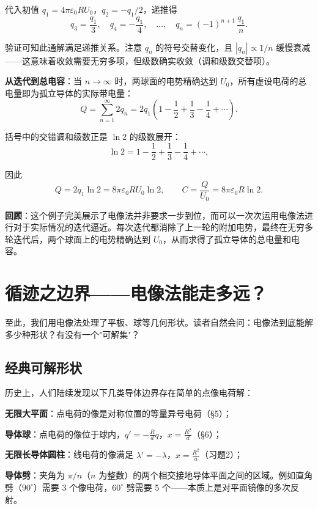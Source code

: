 \begin{so}[两个接触导体球的电容]
    代入初值 $q_1 = 4\pi\varepsilon_0 R U_0$，$q_2 = -q_1/2$，递推得
    \[
        q_3 = \frac{q_1}{3},\quad q_4 = -\frac{q_1}{4},\quad \ldots,\quad
        q_n = (-1)^{n+1}\,\frac{q_1}{n}.
    \]

    验证可知此通解满足递推关系。注意 $q_n$ 的符号交替变化，且 $|q_n| \propto 1/n$ 缓慢衰减——这意味着收敛需要无穷多项，但级数确实收敛（调和级数交替项）。

    \textbf{从迭代到总电容}：当 $n \to \infty$ 时，两球面的电势精确达到 $U_0$，所有虚设电荷的总电量即为孤立导体的实际带电量：
    \[
        Q = \sum_{n=1}^{\infty} 2q_n
        = 2q_1 \left( 1 - \frac{1}{2} + \frac{1}{3} - \frac{1}{4} + \cdots \right).
    \]

    括号中的交错调和级数正是 $\ln 2$ 的级数展开：
    \[
        \ln 2 = 1 - \frac{1}{2} + \frac{1}{3} - \frac{1}{4} + \cdots,
    \]

    因此
    \[
        Q = 2q_1 \ln 2 = 8\pi\varepsilon_0 R U_0 \ln 2,
        \qquad
        \boxed{C = \frac{Q}{U_0} = 8\pi\varepsilon_0 R \ln 2}.
    \]

    \textbf{回顾}：这个例子完美展示了电像法并非要求一步到位，而可以一次次运用电像法进行对于实际情况的迭代逼近。每次迭代都消除了上一轮的附加电势，最终在无穷多轮迭代后，两个球面上的电势精确达到 $U_0$，从而求得了孤立导体的总电量和电容。
\end{so}


\section{循迹之边界——电像法能走多远？}

至此，我们用电像法处理了平板、球等几何形状。读者自然会问：电像法到底能解多少种形状？有没有一个"可解集"？

\subsection{经典可解形状}

历史上，人们陆续发现以下几类导体边界存在简单的点像电荷解：

\begin{Itemize}
    \item \textbf{无限大平面}：点电荷的像是对称位置的等量异号电荷（§5）；
    \item \textbf{导体球}：点电荷的像位于球内，$q' = -\frac{R}{d}q$，$x = \frac{R^2}{d}$（§6）；
    \item \textbf{无限长导体圆柱}：线电荷的像满足 $\lambda' = -\lambda$，$x = \frac{R^2}{a}$（习题2）；
    \item \textbf{导体劈}：夹角为 $\pi/n$（$n$ 为整数）的两个相交接地导体平面之间的区域。例如直角劈（$90^\circ$）需要 3 个像电荷，$60^\circ$ 劈需要 5 个——本质上是对平面镜像的多次反射。
\end{Itemize}


